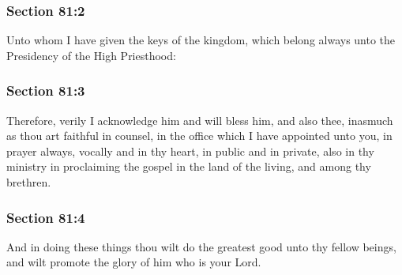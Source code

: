 	\subsubsection{Section 81:2} %
		\label{DC81-2}

		Unto whom I have given the keys of the kingdom, which belong always unto the Presidency of the High Priesthood:


	\subsubsection{Section 81:3} %
		\label{DC81-3}

		Therefore, verily I acknowledge him and will bless him, and also thee, inasmuch as thou art faithful in counsel, in the office which I have appointed unto you, in prayer always, vocally and in thy heart, in public and in private, also in thy ministry in proclaiming the gospel in the land of the living, and among thy brethren.


	\subsubsection{Section 81:4} %
		\label{DC81-4}

		And in doing these things thou wilt do the greatest good unto thy fellow beings, and wilt promote the glory of him who is your Lord.


